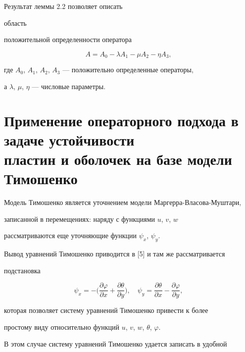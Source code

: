  


\begin{notenonum} Результат леммы 2.2 позволяет описать 


область 


положительной определенности оператора 


$$ 


A=A_0-\lambda A_1-\mu A_2-\eta A_3, 


$$ 


где $A_0$, $A_1$, $A_2$, $A_3$ --- положительно определенные операторы, 


а $\lambda$, $\mu$, $\eta$ --- числовые параметры. 


\end{notenonum} 


 


 


\section{Применение операторного подхода в задаче устойчивости \protect\\ 


пластин и оболочек на базе модели Тимошенко} 


 


Модель Тимошенко является уточнением модели Маргерра-Власова-Муштари, 


записанной в перемещениях: наряду с функциями $u$, $v$, $w$ 


рассматриваются еще уточняющие функции $\psi_x$, $\psi_y$. 


Вывод уравнений Тимошенко приводится в [5] и там же рассматривается 


подстановка 


$$ 


\psi_x=-\biggl(\frac{\partial\varphi}{\partial x}+ 


\frac{\partial\theta}{\partial y}\biggr),\quad 


\psi_y=\frac{\partial\theta}{\partial x}- 


\frac{\partial\varphi}{\partial y}, 


$$ 


которая позволяет систему уравнений Тимошенко привести к более 


простому виду относительно функций $u$, $v$, $w$, $\theta$, $\varphi$. 


В этом случае систему уравнений Тимошенко удается записать в удобной 


